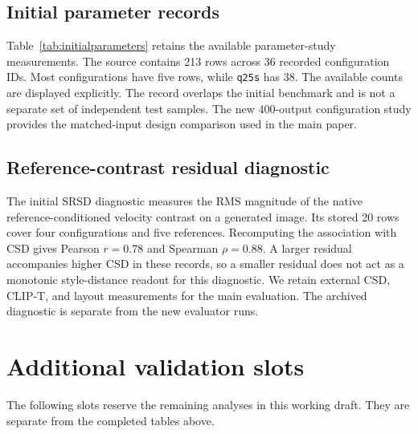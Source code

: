 \begin{table}[p]
\centering\small
\caption{Stored five-reference prompt-extension means from the initial
study. Each row averages five references. These are prompt-level summaries,
separate from the new six-prompt development study.}
\label{tab:initialprompts}

\end{table}

\subsection{Initial parameter records}
Table~\ref{tab:initialparameters} retains the available parameter-study
measurements. The source contains 213 rows across 36 recorded configuration
IDs. Most configurations have five rows, while \texttt{q25s} has 38.
The available counts are displayed explicitly. The record overlaps the
initial benchmark and is not a separate set of independent test samples.
The new 400-output configuration study provides the matched-input design
comparison used in the main paper.

\begin{table}[p]
\centering\small
\caption{Available initial parameter-study records, grouped by their
original configuration IDs. $n$ counts stored observations. Configurations
with different $n$ are not treated as matched-input comparisons.}
\label{tab:initialparameters}

\end{table}

\subsection{Reference-contrast residual diagnostic}
The initial SRSD diagnostic measures the RMS magnitude of the native
reference-conditioned velocity contrast on a generated image. Its stored
20 rows cover four configurations and five references. Recomputing the
association with CSD gives Pearson $r=0.78$ and Spearman
$\rho=0.88$. A larger residual accompanies higher CSD in these records,
so a smaller residual does not act as a monotonic style-distance readout
for this diagnostic. We retain external CSD, CLIP-T, and layout measurements
for the main evaluation. The archived diagnostic is separate from the
new evaluator runs.

\clearpage
\section{Additional validation slots}
\label{sec:supppending}
The following slots reserve the remaining analyses in this working draft.
They are separate from the completed tables above.

